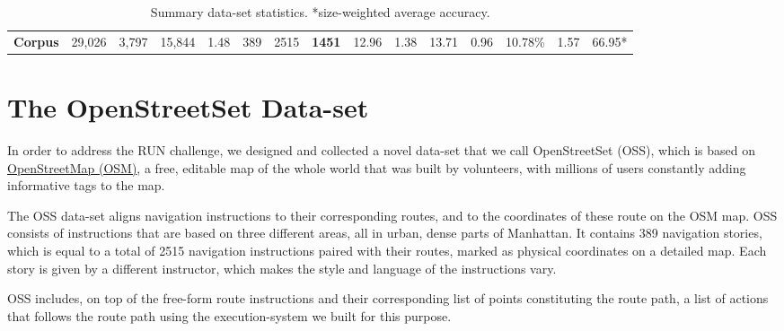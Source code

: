 \documentclass[11pt,a4paper]{article}
\begin{document}
\begin{table*}[h]
{\begin{tabular}{l|llll|lllllllll|l}
\textbf{Corpus} & 29,026                                                            & 3,797                                                               & 15,844                                                              & 1.48                                                               & 389              & 2515                  & \textbf{1451}                                                                & 12.96                                                                          & 1.38                                                                          & 13.71                                                                            & 0.96                                                                                      & 10.78\%                                                                                   & 1.57                                                                                       & 66.95*                                                                                     
\end{tabular}
}
\caption{Summary data-set statistics. *size-weighted average accuracy.}
\end{table*}
 
      
 
\section{The OpenStreetSet Data-set}
\label{data}

In order to address the RUN challenge, we designed and collected a novel data-set that we call  OpenStreetSet (OSS), which is based on \href{http://www.openstreetmap.org}{OpenStreetMap (OSM)}, a free, editable map of the whole world that was built by volunteers, with millions of users constantly adding informative tags to the map.

The OSS data-set aligns navigation instructions to their corresponding  routes, and to the coordinates of these route on the OSM map. OSS consists of instructions  that are based on three different areas, all in urban, dense parts of Manhattan. 
It contains 389 navigation stories, which is equal to a total of 2515 navigation instructions paired with their routes, marked as physical coordinates on a detailed map. Each story is given by a different instructor, which makes the style and language of the instructions vary.

OSS includes, on top of the free-form route instructions and their corresponding list of points constituting the route path,  a list of actions that follows the route path using the execution-system we built for this purpose. 
\end{document}
